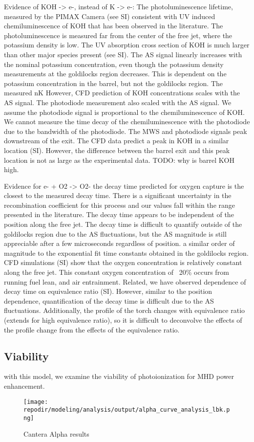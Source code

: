 \begin{outline}
\1 Evidence of KOH -> e-, instead of K -> e-:
    \2 The photoluminescence lifetime, measured by the PIMAX Camera (see SI) consistent with UV induced chemiluminescence of KOH that has been observed in the literature. The photoluminescence is measured far from the center of the free jet, where the potassium density is low.
    \2 The UV absorption cross section of KOH is much larger than other major species present (see SI).
    \2 The AS signal linearly increases with the nominal potassium concentration, even though the potassium density measurements at the goldilocks region decreases. This   is dependent on the potassium concentration in the barrel, but not the goldilocks region. The measured nK However, CFD prediction of KOH concentrations scales with the AS signal. The photodiode measurement also scaled with the AS signal. We assume the photodiode signal is proportional to the chemiluminescence of KOH. We cannot measure the time decay of the chemiluminescence with the photodiode due to the bandwidth of the photodiode.
    \2 The MWS and photodiode signals peak downstream of the exit. The CFD data predict a peak in KOH in a similar location (SI). However, the difference between the barrel exit and this peak location is not as large as the experimental data. TODO: why is barrel KOH high. 

\1 Evidence for e- + O2 -> O2-
    \2 the decay time predicted for oxygen capture is the closest to the measured decay time. There is a significant uncertainty in the recombination coefficient for this process and our values fall within the range presented in the literature. 
    \2 The decay time appears to be independent of the position along the free jet. The decay time is difficult to quantify outside of the goldilocks region due to the AS fluctuations, but the AS magnitude is still appreciable after a few microseconds regardless of position. a similar order of magnitude to the exponential fit time constants obtained in the goldilocks region. CFD simulations (SI) show that the oxygen concentration is relatively constant along the free jet. This constant oxygen concentration of ~20\% occurs from running fuel lean, and air entrainment. 
    \2 Related, we have observed dependence of decay time on equivalence ratio (SI). However, similar to the position dependence, quantification of the decay time is difficult due to the AS fluctuations. Additionally, the profile of the torch changes with equivalence ratio (extends for high equivalence ratio), so it is difficult to deconvolve the effects of the profile change from the effects of the equivalence ratio.

\end{outline}



\subsection{Viability}

with this model, we examine the viability of photoionization for MHD power enhancement. 

\begin{figure}[h]
    \texttt{[image: \\repodir/modeling/analysis/output/alpha\_curve\_analysis\_lbk.png]}
    \caption{Cantera Alpha results}
\end{figure}
